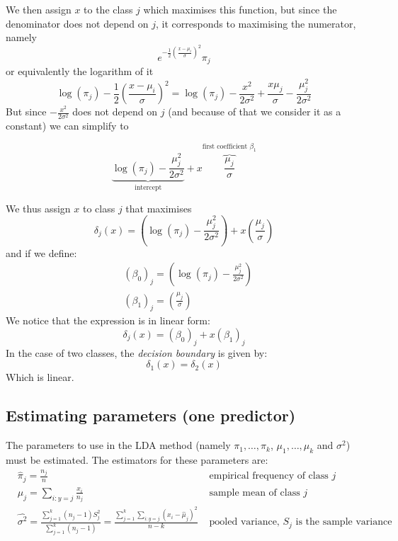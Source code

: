       We then assign $x$ to the class $j$ which maximises this function, but
      since the denominator does not depend on $j$, it corresponds to maximising
      the numerator, namely
      $$e^{-\frac{1}{2}\left(\frac{x-\mu_i}{\sigma}\right)^2}\pi_j$$ or
      equivalently the logarithm of it
      $$
      \log(\pi_j)-\frac{1}{2}\left(\frac{x-\mu_i}{\sigma}\right)^2 =
      \log(\pi_j)-\frac{x^2}{2\sigma^2} + \frac{x\mu_j}{\sigma}-\frac{\mu_j^2}{2\sigma^2}
      $$
      But since $-\frac{x^2}{2\sigma^2}$ does not depend on $j$ (and because of
      that we consider it as a constant) we can simplify to
      
      \begin{equation*}
        \underbrace{\log(\pi_j) - \frac{\mu_j^2}{2\sigma^2}}_\text{intercept} + x \overbrace{\frac{\mu_j}{\sigma}}^\text{first coefficient $\beta_1$}
      \end{equation*}

      We thus assign $x$ to class $j$ that maximises
      $$\delta_j(x) = \left(\log(\pi_j) -\frac{\mu_j^2}{2\sigma^2}\right) + x
      \left(\frac{\mu_j}{\sigma}\right)$$ and if we define:
      \begin{align*}
      &(\beta_0)_j = \left(\log(\pi_j) -\frac{\mu_j^2}{2\sigma^2}\right) \\
      &(\beta_1)_j = \left(\frac{\mu_j}{\sigma}\right)
      \end{align*}
      We notice that the expression is in linear form:
      $$\delta_j(x) = (\beta_0)_j + x(\beta_1)_j$$ In the case of two classes,
      the \textit{decision boundary} is given by:
      $$\delta_1(x)=\delta_2(x)$$ Which is linear.

    \subsection{Estimating parameters (one predictor)}
      The parameters to use in the LDA method (namely $\pi_1, \dots, \pi_k$,
      $\mu_1, \dots, \mu_k$ and $\sigma^2$) must be estimated. The estimators
      for these parameters are:
      \begin{align*}
      &\hat{\pi}_j = \frac{n_j}{n}
      & \text{ empirical frequency of class }j\\
      &\hat{\mu}_j = \sum_{i:y=j} \frac{x_i}{n_j}
      & \text{ sample mean of class }j\\
      &\hat{\sigma^2} = \frac{\sum_{j=1}^{k}(n_j-1)S_j^2}{\sum_{j=1}^{k}(n_j-1)} = \frac{\sum_{j=1}^{k}\sum_{i:y=j}(x_i-\hat{\mu}_j)^2}{n-k}
      & \text{ pooled variance, $S_j$ is the sample variance}\\
      \end{align*}

